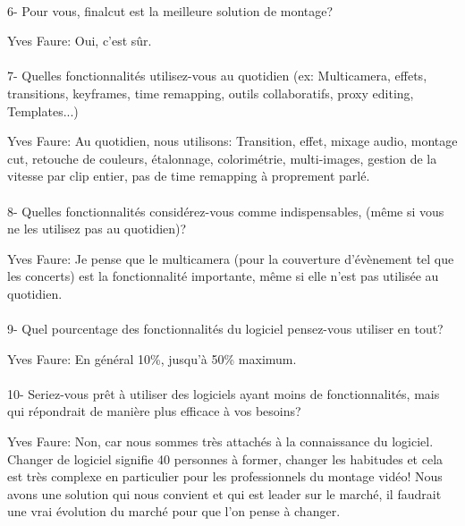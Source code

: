 \paragraph{}
6- Pour vous, finalcut est la meilleure solution de montage?

Yves Faure: Oui, c'est sûr.

\paragraph{}
7-  Quelles fonctionnalités utilisez-vous au quotidien (ex: Multicamera, effets,
transitions, keyframes, time remapping, outils collaboratifs, proxy
editing, Templates...)

Yves Faure: Au quotidien, nous utilisons: Transition, effet, mixage audio, montage cut,
retouche de couleurs, étalonnage, colorimétrie, multi-images, gestion de la
vitesse par clip entier, pas de time remapping à proprement parlé.

\paragraph{}
8-  Quelles fonctionnalités considérez-vous comme indispensables, (même si vous
ne les utilisez pas au quotidien)?

Yves Faure: Je pense que le multicamera (pour la couverture d'évènement tel que les
concerts) est la fonctionnalité importante, même si elle n'est pas utilisée au quotidien.

\paragraph{}
9- Quel pourcentage des fonctionnalités du logiciel pensez-vous utiliser
en tout?

Yves Faure: En général 10\%, jusqu'à 50\% maximum.

\paragraph{}
10- Seriez-vous prêt à utiliser des logiciels ayant moins de
fonctionnalités, mais qui répondrait de manière plus efficace
à vos besoins?

Yves Faure: Non, car nous sommes très attachés à la connaissance du logiciel.
Changer de logiciel signifie 40 personnes à former, changer les
habitudes et cela est très complexe en particulier pour les professionnels
du montage vidéo! Nous avons une solution qui nous convient et qui est leader
sur le marché, il faudrait une vrai évolution du marché pour que l'on pense à
changer.

